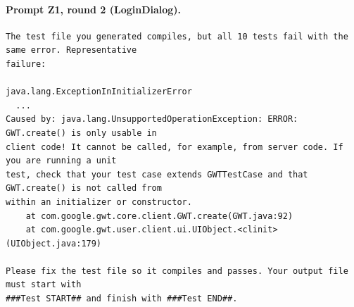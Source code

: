 \paragraph*{Prompt Z1, round 2 (LoginDialog).}
\label{prompt:ld-z1-r2}
\begin{lstlisting}
The test file you generated compiles, but all 10 tests fail with the same error. Representative
failure:

java.lang.ExceptionInInitializerError
  ...
Caused by: java.lang.UnsupportedOperationException: ERROR: GWT.create() is only usable in
client code! It cannot be called, for example, from server code. If you are running a unit
test, check that your test case extends GWTTestCase and that GWT.create() is not called from
within an initializer or constructor.
	at com.google.gwt.core.client.GWT.create(GWT.java:92)
	at com.google.gwt.user.client.ui.UIObject.<clinit>(UIObject.java:179)

Please fix the test file so it compiles and passes. Your output file must start with
###Test START## and finish with ###Test END##.
\end{lstlisting}

